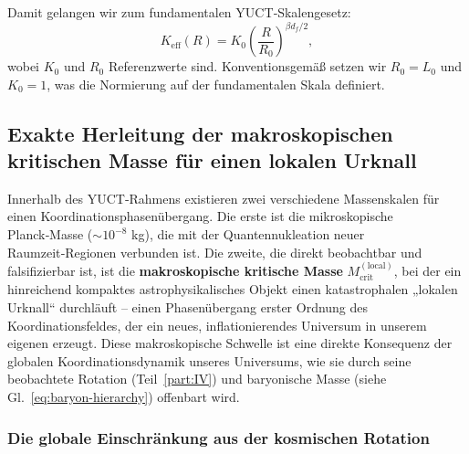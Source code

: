 \documentclass[11pt,a4paper]{article}
\newcommand{\Keff}{K_{\mathrm{eff}}}
\newcommand{\Lzero}{L_0}
\begin{document}
	Damit gelangen wir zum fundamentalen YUCT‑Skalengesetz:
	\begin{equation}
		\Keff(R) = K_0 \left( \frac{R}{R_0} \right)^{\beta d_f / 2},
		\label{eq:keff-scaling}
	\end{equation}
	wobei \(K_0\) und \(R_0\) Referenzwerte sind. Konventionsgemäß setzen wir \(R_0 = \Lzero\) und \(K_0 = 1\), was die Normierung auf der fundamentalen Skala definiert.
	
	\subsection{Exakte Herleitung der makroskopischen kritischen Masse für einen lokalen Urknall}
	\label{subsec:Mcrit-macroscopic}
	
	Innerhalb des YUCT‑Rahmens existieren zwei verschiedene Massenskalen für einen Koordinationsphasenübergang. Die erste ist die mikroskopische Planck‑Masse (\(\sim 10^{-8}\) kg), die mit der Quantennukleation neuer Raumzeit‑Regionen verbunden ist. Die zweite, die direkt beobachtbar und falsifizierbar ist, ist die \textbf{makroskopische kritische Masse} \(M_{\mathrm{crit}}^{\mathrm{(local)}}\), bei der ein hinreichend kompaktes astrophysikalisches Objekt einen katastrophalen „lokalen Urknall“ durchläuft – einen Phasenübergang erster Ordnung des Koordinationsfeldes, der ein neues, inflationierendes Universum in unserem eigenen erzeugt. Diese makroskopische Schwelle ist eine direkte Konsequenz der globalen Koordinationsdynamik unseres Universums, wie sie durch seine beobachtete Rotation (Teil~\ref{part:IV}) und baryonische Masse (siehe Gl.~\ref{eq:baryon-hierarchy}) offenbart wird.
	
	\subsubsection{Die globale Einschränkung aus der kosmischen Rotation}
	
\end{document}
